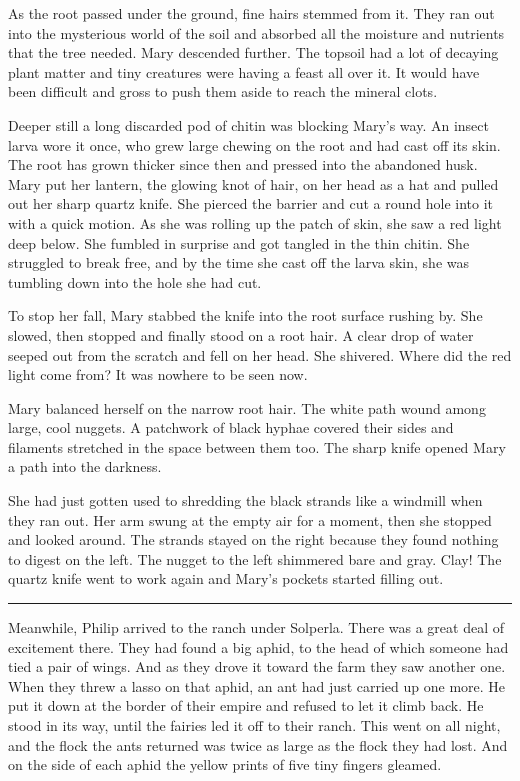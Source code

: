\documentclass[10pt, draft]{memoir}
\renewcommand{\pfbreakdisplay}{\bigskip \ding{166} \bigskip}
\newcommand{\secbreak}{\fancybreak{\pfbreakdisplay}}
\begin{document}
As the root passed under the ground, fine hairs stemmed from it. They ran out into the mysterious world of the soil and absorbed all the moisture and nutrients that the tree needed. Mary descended further. The topsoil had a lot of decaying plant matter and tiny creatures were having a feast all over it. It would have been difficult and gross to push them aside to reach the mineral clots.

Deeper still a long discarded pod of chitin was blocking Mary's way. An insect larva wore it once, who grew large chewing on the root and had cast off its skin. The root has grown thicker since then and pressed into the abandoned husk. Mary put her lantern, the glowing knot of hair, on her head as a hat and pulled out her sharp quartz knife. She pierced the barrier and cut a round hole into it with a quick motion. As she was rolling up the patch of skin, she saw a red light deep below. She fumbled in surprise and got tangled in the thin chitin. She struggled to break free, and by the time she cast off the larva skin, she was tumbling down into the hole she had cut.

To stop her fall, Mary stabbed the knife into the root surface rushing by. She slowed, then stopped and finally stood on a root hair. A clear drop of water seeped out from the scratch and fell on her head. She shivered. Where did the red light come from? It was nowhere to be seen now.

Mary balanced herself on the narrow root hair. The white path wound among large, cool nuggets. A patchwork of black hyphae covered their sides and filaments stretched in the space between them too. The sharp knife opened Mary a path into the darkness.

She had just gotten used to shredding the black strands like a windmill when they ran out. Her arm swung at the empty air for a moment, then she stopped and looked around. The strands stayed on the right because they found nothing to digest on the left. The nugget to the left shimmered bare and gray. Clay! The quartz knife went to work again and Mary's pockets started filling out.

\secbreak

Meanwhile, Philip arrived to the ranch under Solperla. There was a great deal of excitement there. They had found a big aphid, to the head of which someone had tied a pair of wings. And as they drove it toward the farm they saw another one. When they threw a lasso on that aphid, an ant had just carried up one more. He put it down at the border of their empire and refused to let it climb back. He stood in its way, until the fairies led it off to their ranch. This went on all night, and the flock the ants returned was twice as large as the flock they had lost. And on the side of each aphid the yellow prints of five tiny fingers gleamed.
\end{document}
